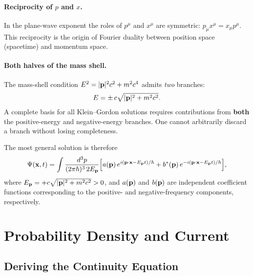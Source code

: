 \documentclass[12pt, a4paper]{article}
\theoremstyle{definition}
\begin{document}
\paragraph{Reciprocity of $p$ and $x$.}
In the plane-wave exponent the roles of $p^{\mu}$ and $x^{\mu}$ are
symmetric: $p_{\mu}x^{\mu} = x_{\mu}p^{\mu}$.  This reciprocity is the
origin of Fourier duality between position space (spacetime) and momentum
space.

\paragraph{Both halves of the mass shell.}
The mass-shell condition $E^{2} = |\vb{p}|^{2}c^{2}+m^{2}c^{4}$ admits
\emph{two} branches:
\begin{equation}\label{eq:two-branches}
    E = \pm\,c\sqrt{|\vb{p}|^{2}+m^{2}c^{2}}.
\end{equation}
A complete basis for all Klein--Gordon solutions requires contributions from
\textbf{both} the positive-energy and negative-energy branches.  One cannot
arbitrarily discard a branch without losing completeness.

The most general solution is therefore
\begin{equation}\label{eq:general-solution}
    \Psi(\vb{x},t)
    = \int \frac{d^{3}p}{(2\pi\hbar)^{3}\,2E_{\vb{p}}}
      \Bigl[
        a(\vb{p})\,e^{i(\vb{p}\cdot\vb{x}-E_{\vb{p}}t)/\hbar}
        + b^{*}(\vb{p})\,e^{-i(\vb{p}\cdot\vb{x}-E_{\vb{p}}t)/\hbar}
      \Bigr],
\end{equation}
where $E_{\vb{p}} = +c\sqrt{|\vb{p}|^{2}+m^{2}c^{2}} > 0$, and $a(\vb{p})$
and $b(\vb{p})$ are independent coefficient functions corresponding to the
positive- and negative-frequency components, respectively.

\section{Probability Density and Current}
\label{sec:probability}

\subsection{Deriving the Continuity Equation}
\end{document}
